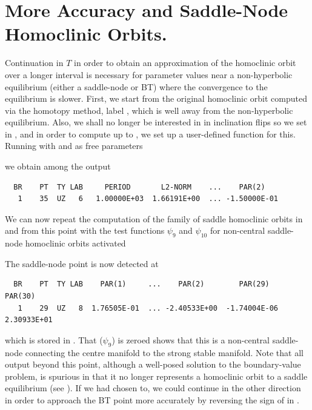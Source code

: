 \documentclass[12pt]{report}
\begin{document}
\section{More Accuracy and Saddle-Node Homoclinic Orbits.}
Continuation in $T$ 
in order to obtain an approximation of the homoclinic orbit over a
longer interval is necessary for parameter values near a non-hyperbolic
equilibrium (either a saddle-node or BT) where the convergence
to the equilibrium is slower. 
First, we start from the original homoclinic orbit computed
via the homotopy method, label , which is well away from
the non-hyperbolic equilibrium.
Also, we shall no longer be interested in
in inclination flips so we set  in ,
and in order to compute up to , we set up a
user-defined function for this. Running \AUTO with  and 
 as free parameters
\begin{center}
\end{center}
we obtain among the output
\begin{verbatim}
  BR    PT  TY LAB     PERIOD       L2-NORM    ...    PAR(2)     
   1    35  UZ   6   1.00000E+03  1.66191E+00  ... -1.50000E-01
\end{verbatim}

We can now repeat the computation of the family of saddle homoclinic
orbits in  and  from this point with
the test functions $\psi_9$ and $\psi_{10}$ for non-central
saddle-node homoclinic orbits activated 
\begin{center}
\end{center}
The saddle-node point is now detected at 
\begin{verbatim} 
  BR    PT  TY LAB    PAR(1)     ...    PAR(2)        PAR(29)       PAR(30)
   1    29  UZ   8  1.76505E-01  ... -2.40533E+00  -1.74004E-06   2.30933E+01
\end{verbatim}
which is stored in .
That  ($\psi_9$) is zeroed shows that this
is a non-central saddle-node connecting the centre manifold to the strong stable
manifold. Note that all output beyond this point, although a well-posed
solution to the boundary-value problem, is spurious in that it no longer
represents a homoclinic orbit to a saddle equilibrium (see
). If we had chosen
to, we could continue in the other direction in order to
approach the BT point more accurately by reversing the sign of
 in .
 
\end{document}
